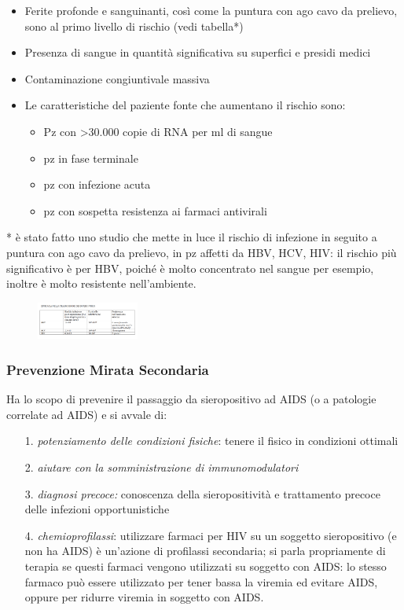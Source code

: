 \begin{itemize}
\item
  Ferite profonde e sanguinanti, così come la puntura con ago cavo da
  prelievo, sono al primo livello di rischio (vedi tabella*)
\item
  Presenza di sangue in quantità significativa su superfici e presidi
  medici
\item
  Contaminazione congiuntivale massiva
\item
  Le caratteristiche del paziente fonte che aumentano il rischio sono:

  \begin{itemize}
  \item
    Pz con \textgreater{}30.000 copie di RNA per ml di sangue
  \item
    pz in fase terminale
  \item
    pz con infezione acuta
  \item
    pz con sospetta resistenza ai farmaci antivirali
  \end{itemize}
\end{itemize}

* è stato fatto uno studio che mette in luce il rischio di infezione in
seguito a puntura con ago cavo da prelievo, in pz affetti da HBV, HCV,
HIV: il rischio più significativo è per HBV, poiché è molto concentrato
nel sangue per esempio, inoltre è molto resistente nell'ambiente.

\begin{figure}[!ht]
\centering
	\includegraphics[width=0.3\textwidth]{12/image1.png}
	\end{figure}

\subsubsection{Prevenzione Mirata Secondaria}

Ha lo scopo di prevenire il passaggio da sieropositivo ad AIDS (o a
patologie correlate ad AIDS) e si avvale di:

\begin{itemize}
\item[1.]
  \emph{potenziamento delle condizioni fisiche}: tenere il fisico in
  condizioni ottimali
\item[2.]
  \emph{aiutare con la somministrazione di immunomodulatori}
\item[3.]
  \emph{diagnosi precoce:} conoscenza della sieropositività e
  trattamento precoce delle infezioni opportunistiche
\item[4.]
  \emph{chemioprofilassi}: utilizzare farmaci per HIV su un soggetto
  sieropositivo (e non ha AIDS) è un'azione di profilassi secondaria; si
  parla propriamente di terapia se questi farmaci vengono utilizzati su
  soggetto con AIDS: lo stesso farmaco può essere utilizzato per tener
  bassa la viremia ed evitare AIDS, oppure per ridurre viremia in
  soggetto con AIDS.
\end{itemize}

